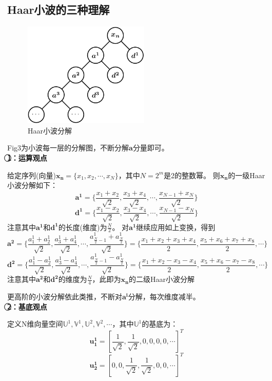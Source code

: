 \documentclass{article}
\begin{document}
\begin{CJK}{UTF8}{gbsn}
\section{Haar小波的三种理解}
\begin{figure}[H]
\centering
\includegraphics[height=5cm,width=6cm]{./figs/fig3.pdf}
\caption{Haar小波分解}
\label{3}
\end{figure}
	Fig3为小波每一层的分解图，不断分解$\boldsymbol{a}$分量即可。\\
	\textbf{\textcircled{1}：运算观点}\par
	给定序列(向量)$\boldsymbol{x_n}=\{x_1,x_2,\cdots,x_N\}$，其中$N=2^m$是2的整数幂。
	则$\boldsymbol{x_n}$的一级Haar小波分解如下：
	$$\boldsymbol{a^1}=\{\frac{x_1+x_2}{\sqrt{2}},\frac{x_3+x_4}{\sqrt{2}},\cdots,\frac{x_{N-1}+x_N}{\sqrt{2}}\}$$
	$$\boldsymbol{d^1}=\{\frac{x_1-x_2}{\sqrt{2}},\frac{x_3-x_4}{\sqrt{2}},\cdots,\frac{x_{N-1}-x_N}{\sqrt{2}}\}$$
	注意其中$\boldsymbol{a^1}$和$\boldsymbol{d^1}$的长度(维度)为$\frac{N}{2}$。
	对$\boldsymbol{a^1}$继续应用如上变换，得到
	$$\boldsymbol{a^2}=\{\frac{a^1_1+a^1_2}{\sqrt{2}},\frac{a^1_3+a^1_4}{\sqrt{2}},\cdots,\frac{a^1_{\frac{N}{2}-1}+a^1_{\frac{N}{2}}}{\sqrt{2}}\}=\{\frac{x_1+x_2+x_3+x_4}{2},\frac{x_5+x_6+x_7+x_8}{2},\cdots\}$$
    $$\boldsymbol{d^2}=\{\frac{a^1_1-a^1_2}{\sqrt{2}},\frac{a^1_3-a^1_4}{\sqrt{2}},\cdots,\frac{a^1_{\frac{N}{2}-1}-a^1_{\frac{N}{2}}}{\sqrt{2}}\}=\{\frac{x_1+x_2-x_3-x_4}{2},\frac{x_5+x_6-x_7-x_8}{2},\cdots\}$$
	注意其中$\boldsymbol{a^2}$和$\boldsymbol{d^2}$的维度为$\frac{N}{4}$，此即为$\boldsymbol{x_n}$的二级Haar小波分解\par
	更高阶的小波分解依此类推，不断对$\boldsymbol{a^i}$分解，每次维度减半。\\
	\textbf{\textcircled{2}：基底观点}\par
	定义N维向量空间$\mathbb{U}^1,\mathbb{V}^1,\mathbb{U}^2,\mathbb{V}^2,\cdots$，其中$\mathbb{U}^1$的基底为：
	$$\boldsymbol{u^1_1}=[\frac{1}{\sqrt{2}},\frac{1}{\sqrt{2}},0,0,0,0,\cdots]^T$$
	$$\boldsymbol{u^1_2}=[0,0,\frac{1}{\sqrt{2}},\frac{1}{\sqrt{2}},0,0,\cdots]^T$$

\end{CJK}
\end{document}
